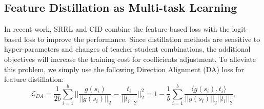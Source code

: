 \documentclass{article}
\begin{document}
\subsection{Feature Distillation as Multi-task Learning}
In recent work, SRRL and CID combine the feature-based loss with the logit-based loss to improve the performance. Since distillation methods are sensitive to hyper-parameters and changes of teacher-student combinations, the additional objectives will increase the training cost for coefficients adjustment. To alleviate this problem, we simply use the following Direction Alignment (DA) loss \cite{at,da1,da2} for feature distillation:
\begin{equation}
    \mathcal{L}_{DA} = \frac{1}{2b}\sum_{i=1}^b||\frac{g(s_i)}{||g(s_i)||_2}-\frac{t_i}{||t_i||_2}||_2^2=1- \frac{1}{b}\sum_{i=1}^b\frac{\langle g(s_i),t_i\rangle}{||g(s_i)||_2||t_i||_2},
\end{equation}
\end{document}
